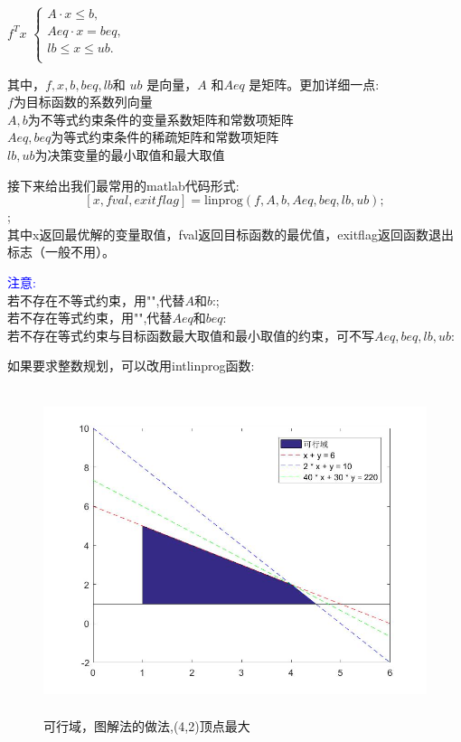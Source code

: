 \documentclass[a4paper,20pt]{article}
\begin{document}
 $f^Tx$ $\left\{\begin{matrix}
        A \cdot x \leq b,  \\
        Aeq \cdot x = beq, \\
        lb\leq x \leq ub.  \\
    \end{matrix}\right.$
\par 其中，$f,x,b,beq,lb$和 $ub$ 是向量，$A$ 和$ Aeq$ 是矩阵。更加详细一点:
\\$f$为目标函数的系数列向量
    \\ $A,b$为不等式约束条件的变量系数矩阵和常数项矩阵
    \\$Aeq,beq$为等式约束条件的稀疏矩阵和常数项矩阵
\\$lb,ub$为决策变量的最小取值和最大取值
    \par 接下来给出我们最常用的matlab代码形式:
    \[ [x, fval,exitflag] = \text{linprog}(f, A, b, Aeq, beq, lb, ub); \] ;
    \\其中x返回最优解的变量取值，fval返回目标函数的最优值，exitflag返回函数退出标志（一般不用）。
    \par \textcolor{blue}{注意:}
    \\若不存在不等式约束，用"\text{[ ]}",代替$A$和$b$:;
    \\若不存在等式约束，用"\text{[ ]}",代替$Aeq$和$beq$:
    \\若不存在等式约束与目标函数最大取值和最小取值的约束，可不写$Aeq,beq,lb,ub$:
    \par 如果要求整数规划，可以改用intlinprog函数:
    \begin{figure}[H]
        \centering
        \includegraphics[width=340pt,height=270pt]{figure1.jpg}
        \caption{可行域，图解法的做法,(4,2)顶点最大}
    \end{figure}
\end{document}
